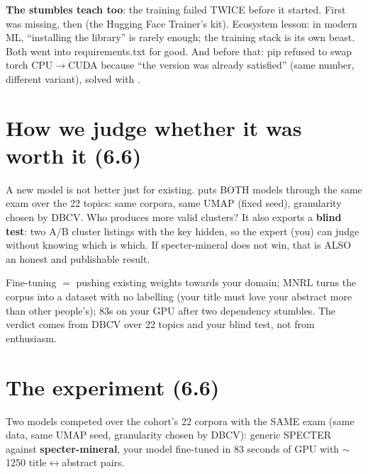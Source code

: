 \documentclass[11pt,a4paper]{article}
\begin{document}
\begin{ojo}
\textbf{The stumbles teach too}: the training failed TWICE before it started. First
 was missing, then  (the Hugging Face Trainer's kit).
Ecosystem lesson: in modern ML, ``installing the library'' is rarely enough; the training stack
is its own beast. Both went into requirements.txt for good. And before that: pip refused to
swap torch CPU$\rightarrow$CUDA because ``the version was already satisfied'' (same number,
different variant), solved with .
\end{ojo}

\section{How we judge whether it was worth it (6.6)}

A new model is not better just for existing.  puts BOTH models
through the same exam over the 22 topics: same corpora, same UMAP (fixed seed), granularity
chosen by DBCV. Who produces more valid clusters? It also exports a \textbf{blind test}: two
A/B cluster listings with the key hidden, so the expert (you) can judge without knowing which
is which. If specter-mineral does not win, that is ALSO an honest and publishable result.

\begin{resumen}
Fine-tuning $=$ pushing existing weights towards your domain; MNRL turns the corpus into a
dataset with no labelling (your title must love your abstract more than other people's); 83s on
your GPU after two dependency stumbles. The verdict comes from DBCV over 22 topics and your
blind test, not from enthusiasm.
\end{resumen}
\clearpage
{}
{}

\section{The experiment (6.6)}

Two models competed over the cohort's 22 corpora with the SAME exam (same data, same UMAP seed,
granularity chosen by DBCV): generic SPECTER against \textbf{specter-mineral}, your model
fine-tuned in 83 seconds of GPU with $\sim$1250 title$\leftrightarrow$abstract pairs.
\end{document}
